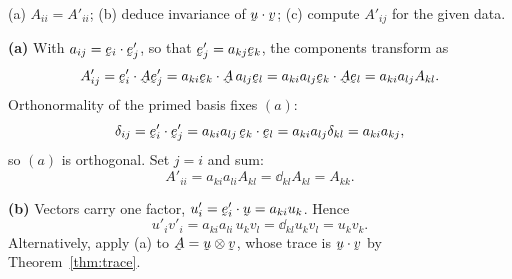 \begin{problem}
(a) $A_{ii}=A'_{ii}$; (b) deduce invariance of $\ip\bu\bv$; (c) compute
$A'_{ij}$ for the given data.
\end{problem}
\begin{solution}
\textbf{(a)} With $a_{ij}=\ip{\be_i}{\be'_j}$, so that
$\be'_j=a_{kj}\be_k$, the components transform as
\[
   A'_{ij}=\ip{\be'_i}{\bA\be'_j}
   =\ip{a_{ki}\be_k}{\bA\,a_{lj}\be_l}
   =a_{ki}a_{lj}\ip{\be_k}{\bA\be_l}
   =a_{ki}a_{lj}A_{kl}.
\]
Orthonormality of the primed basis fixes $(a)$:
\[
   \dd_{ij}=\ip{\be'_i}{\be'_j}=a_{ki}a_{lj}\,\ip{\be_k}{\be_l}
   =a_{ki}a_{lj}\dd_{kl}=a_{ki}a_{kj},
\]
so $(a)$ is orthogonal. Set $j=i$ and sum:
\[
   A'_{ii}=a_{ki}a_{li}A_{kl}=\dd_{kl}A_{kl}=A_{kk}.
\]

\textbf{(b)} Vectors carry one factor, $u'_i=\ip{\be'_i}{\bu}
=a_{ki}u_k$. Hence
\[
   u'_iv'_i=a_{ki}a_{li}\,u_kv_l=\dd_{kl}u_kv_l=u_kv_k .
\]
Alternatively, apply (a) to $\bA=\bu\otimes\bv$, whose trace is
$\ip\bu\bv$ by Theorem~\ref{thm:trace}.


\end{solution}
